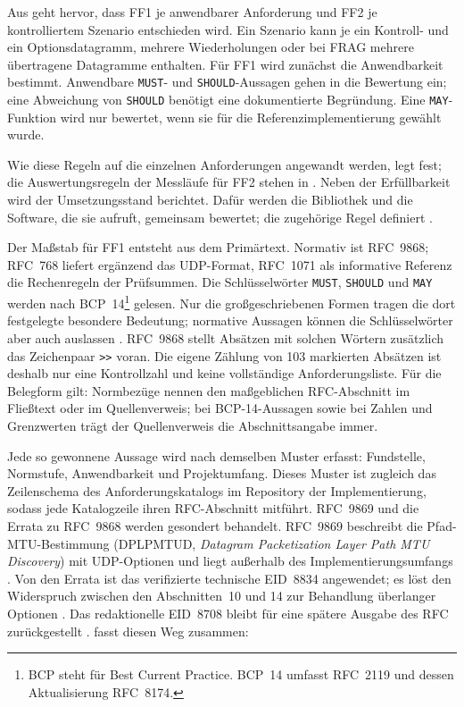 Aus  geht hervor, dass FF1 je anwendbarer Anforderung und FF2 je
kontrolliertem Szenario entschieden wird. Ein Szenario kann je ein Kontroll- und ein Optionsdatagramm,
mehrere Wiederholungen oder bei FRAG mehrere übertragene Datagramme enthalten.
Für FF1 wird zunächst die Anwendbarkeit bestimmt. Anwendbare \texttt{MUST}- und
\texttt{SHOULD}-Aussagen gehen in die Bewertung ein; eine Abweichung von \texttt{SHOULD} benötigt eine
dokumentierte Begründung. Eine \texttt{MAY}-Funktion wird nur bewertet, wenn sie für die
Referenzimplementierung gewählt wurde.

Wie diese Regeln auf die einzelnen Anforderungen angewandt werden, legt  fest; die
Auswertungsregeln der Messläufe für FF2 stehen in . Neben der Erfüllbarkeit wird der
Umsetzungsstand berichtet. Dafür werden die Bibliothek und die Software, die sie aufruft, gemeinsam
bewertet; die zugehörige Regel definiert .

Der Maßstab für FF1 entsteht aus dem Primärtext. Normativ ist RFC~9868; RFC~768 liefert ergänzend das
UDP-Format, RFC~1071 als informative Referenz die Rechenregeln der Prüfsummen. Die Schlüsselwörter
\texttt{MUST}, \texttt{SHOULD} und \texttt{MAY} werden nach BCP~14\footnote{BCP steht für Best Current
Practice. BCP~14 umfasst RFC~2119 und dessen Aktualisierung RFC~8174.} gelesen. Nur die großgeschriebenen
Formen tragen die dort festgelegte besondere Bedeutung; normative Aussagen können die Schlüsselwörter aber
auch auslassen \cite{rfc2119,rfc8174}. RFC~9868 stellt Absätzen mit solchen Wörtern zusätzlich das
Zeichenpaar \texttt{>{}>} voran. Die eigene Zählung von 103 markierten Absätzen ist deshalb nur eine
Kontrollzahl und keine vollständige Anforderungsliste. Für die Belegform gilt: Normbezüge nennen den
maßgeblichen RFC-Abschnitt im Fließtext oder im Quellenverweis; bei BCP-14-Aussagen sowie bei Zahlen und
Grenzwerten trägt der Quellenverweis die Abschnittsangabe immer.

Jede so gewonnene Aussage wird nach demselben Muster erfasst: Fundstelle, Normstufe, Anwendbarkeit und
Projektumfang. Dieses Muster ist zugleich das Zeilenschema des Anforderungskatalogs im
Repository der Implementierung, sodass jede Katalogzeile ihren RFC-Abschnitt mitführt. RFC~9869 und die Errata
zu RFC~9868 werden gesondert behandelt. RFC~9869 beschreibt die Pfad-MTU-Bestimmung (DPLPMTUD, \textit{Datagram
Packetization Layer Path MTU Discovery}) mit UDP-Optionen und liegt außerhalb des Implementierungsumfangs
\cite{rfc9869}. Von den Errata ist das verifizierte technische EID~8834 angewendet; es löst den Widerspruch
zwischen den Abschnitten~10 und 14 zur Behandlung überlanger Optionen \cite{rfc9868-eid8834}. Das
redaktionelle EID~8708 bleibt für eine spätere Ausgabe des RFC zurückgestellt \cite{rfc9868-eid8708}.
 fasst diesen Weg zusammen:

